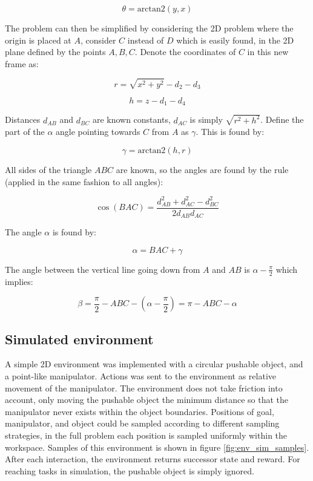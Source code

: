 \begin{equation}
    \theta = \text{arctan2}(y, x)
\end{equation}

The problem can then be simplified by considering the 2D problem where the
origin is placed at $A$, consider $C$ instead of $D$ which is easily found, in
the 2D plane defined by the points $A, B, C$. Denote the coordinates of $C$ in
this new frame as:

\begin{equation}
    r = \sqrt{x^2 + y^2} - d_2 - d_3
\end{equation}

\begin{equation}
    h = z - d_1 - d_4
\end{equation}

Distances $d_{AB}$ and $d_{BC}$ are known constants, $d_{AC}$ is simply
$\sqrt{r^2 + h^2}$. Define the part of the $\alpha$ angle pointing towards
$C$ from $A$ as $\gamma$. This is found by:

\begin{equation}
    \gamma = \text{arctan2}(h, r)
\end{equation}

All sides of the triangle $ABC$ are known, so the angles are found by the rule (applied in the same fashion to all angles):

\begin{equation}
    \cos(BAC) = \frac{d_{AB}^2 + d_{AC}^2 - d_{BC}^2}{2 d_{AB} d_{AC}}
\end{equation}

The angle $\alpha$ is found by:

\begin{equation}
    \alpha = BAC + \gamma
\end{equation}

The angle between the vertical line going down from $A$ and $AB$ is $\alpha - \frac{\pi}{2}$
which implies:

\begin{equation}
    \beta = \frac{\pi}{2} - ABC - (\alpha - \frac{\pi}{2}) = \pi - ABC - \alpha
\end{equation}

\subsection{Simulated environment}

A simple 2D environment was implemented with a circular pushable object, and a
point-like manipulator. Actions was sent to the environment as relative
movement of the manipulator. The environment does not take friction into
account, only moving the pushable object the minimum distance so that the
manipulator never exists within the object boundaries. Positions of goal,
manipulator, and object could be sampled according to different sampling
strategies, in the full problem each position is sampled uniformly within the
workspace. Samples of this environment is shown in figure
\ref{fig:env_sim_samples}. After each interaction, the environment returns
successor state and reward. For reaching tasks in simulation, the pushable
object is simply ignored.

